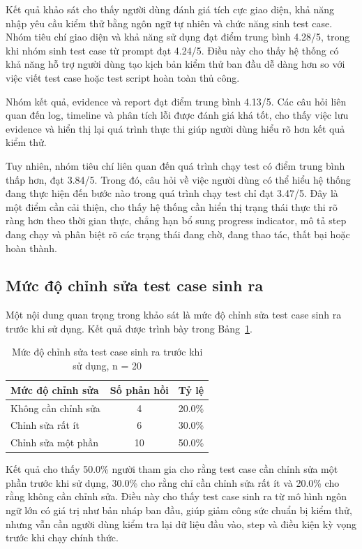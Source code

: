 Kết quả khảo sát cho thấy người dùng đánh giá tích cực giao diện, khả năng nhập yêu cầu kiểm thử bằng ngôn ngữ tự nhiên và chức năng sinh test case. Nhóm tiêu chí giao diện và khả năng sử dụng đạt điểm trung bình 4.28/5, trong khi nhóm sinh test case từ prompt đạt 4.24/5. Điều này cho thấy hệ thống có khả năng hỗ trợ người dùng tạo kịch bản kiểm thử ban đầu dễ dàng hơn so với việc viết test case hoặc test script hoàn toàn thủ công.

Nhóm kết quả, evidence và report đạt điểm trung bình 4.13/5. Các câu hỏi liên quan đến log, timeline và phân tích lỗi được đánh giá khá tốt, cho thấy việc lưu evidence và hiển thị lại quá trình thực thi giúp người dùng hiểu rõ hơn kết quả kiểm thử.

Tuy nhiên, nhóm tiêu chí liên quan đến quá trình chạy test có điểm trung bình thấp hơn, đạt 3.84/5. Trong đó, câu hỏi về việc người dùng có thể hiểu hệ thống đang thực hiện đến bước nào trong quá trình chạy test chỉ đạt 3.47/5. Đây là một điểm cần cải thiện, cho thấy hệ thống cần hiển thị trạng thái thực thi rõ ràng hơn theo thời gian thực, chẳng hạn bổ sung progress indicator, mô tả step đang chạy và phân biệt rõ các trạng thái đang chờ, đang thao tác, thất bại hoặc hoàn thành.

\subsection{Mức độ chỉnh sửa test case sinh ra}

Một nội dung quan trọng trong khảo sát là mức độ chỉnh sửa test case sinh ra trước khi sử dụng. Kết quả được trình bày trong Bảng~\ref{tab:chapter6_testcase_revision_survey}.

\begin{table}[H]
\centering
\caption{Mức độ chỉnh sửa test case sinh ra trước khi sử dụng, n = 20}
\label{tab:chapter6_testcase_revision_survey}
\renewcommand{\arraystretch}{1.2}
\begin{tabular}{|p{7.0cm}|c|c|}
\hline
\textbf{Mức độ chỉnh sửa} & \textbf{Số phản hồi} & \textbf{Tỷ lệ} \\
\hline
Không cần chỉnh sửa & 4 & 20.0\% \\
\hline
Chỉnh sửa rất ít & 6 & 30.0\% \\
\hline
Chỉnh sửa một phần & 10 & 50.0\% \\
\hline
\end{tabular}
\end{table}

Kết quả cho thấy 50.0\% người tham gia cho rằng test case cần chỉnh sửa một phần trước khi sử dụng, 30.0\% cho rằng chỉ cần chỉnh sửa rất ít và 20.0\% cho rằng không cần chỉnh sửa. Điều này cho thấy test case sinh ra từ mô hình ngôn ngữ lớn có giá trị như bản nháp ban đầu, giúp giảm công sức chuẩn bị kiểm thử, nhưng vẫn cần người dùng kiểm tra lại dữ liệu đầu vào, step và điều kiện kỳ vọng trước khi chạy chính thức.

